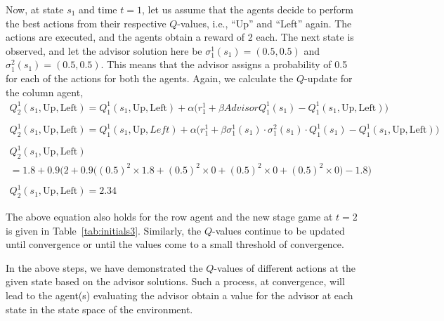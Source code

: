 \documentclass[jair, twoside,11pt,theapa]{article}
\begin{document}
Now, at state $s_1$ and time $t=1$, let us assume that the agents decide to perform the best actions from their respective $Q$-values, i.e., ``Up'' and ``Left'' again. The actions are executed, and the agents obtain a reward of 2 each. The next state is observed, and let the advisor solution here be $\sigma^{1}_1(s_1) = (0.5, 0.5)$ and $\sigma^{2}_1(s_1) = (0.5, 0.5)$. This means that the advisor assigns a probability of 0.5 for each of the actions for both the agents. Again, we calculate the $Q$-update for the column agent, 
\begin{equation}
    \begin{array}{l}
Q^{1}_2(s_1, \textrm{Up}, \textrm{Left}) =  Q^{1}_1(s_1, \textrm{Up}, \textrm{Left}) + \alpha \Big(r^{1}_1 + \beta AdvisorQ^{1}_1(s_1) - Q^{1}_1(s_1, \textrm{Up},\textrm{Left}) \Big)
\\ \\
Q^{1}_2(s_1, \textrm{Up}, \textrm{Left}) =  Q^{1}_1(s_1, \textrm{Up}, Left)  + \alpha \Big(r^{1}_1 + \beta \sigma^1_1(s_1) \cdot \sigma^2_1(s_1) \cdot Q^1_1(s_1) - Q^{1}_1(s_1, \textrm{Up}, \textrm{Left}) \Big)
\\ \\ 
Q^{1}_2(s_1, \textrm{Up}, \textrm{Left}) 
\\ =  1.8 + 0.9 \Big(2 + 0.9 \big( (0.5)^2 \times 1.8  
+  (0.5)^2 \times 0 +  (0.5)^2 \times 0 +  (0.5)^2 \times 0 \big) - 1.8 \Big)
\\ \\
Q^{1}_2(s_1, \textrm{Up}, \textrm{Left}) =  2.34
    \end{array}
\end{equation}


The above equation also holds for the row agent and the new stage game at $t = 2$ is given in Table~\ref{tab:initials3}. Similarly, the $Q$-values continue to be updated until convergence or until the values come to a small threshold of convergence.   

In the above steps, we have demonstrated the $Q$-values of different actions at the given state based on the advisor solutions. Such a process, at convergence, will lead to the agent(s) evaluating the advisor obtain a value for the advisor at each state in the state space of
the environment. 
\end{document}
